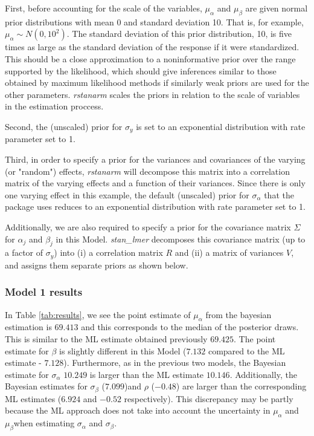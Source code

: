 First, before accounting for the scale of the variables, $\mu_{\alpha}$ and $\mu_{\beta}$ are given normal prior distributions with mean 0 and standard deviation 10.  That is, for example, $\mu_{\alpha} \sim N(0, 10^2)$. The standard deviation of this prior distribution, 10, is five times as large as the standard deviation of the response if it were standardized. This should be a close approximation to a noninformative prior over the range supported by the likelihood, which should give inferences similar to those obtained by maximum likelihood methods if similarly weak priors are used for the other parameters. \textit{rstanarm} scales the priors in relation to the scale of variables in the estimation proccess.

Second, the (unscaled) prior for $\sigma_{y}$ is set to an exponential distribution with rate parameter set to 1.

Third, in order to specify a prior for the variances and covariances of the varying (or "random") effects, \textit{rstanarm} will decompose this matrix into a correlation matrix of the varying effects and a function of their variances.  Since there is only one varying effect in this example, the default (unscaled) prior for $\sigma_{\alpha}$ that the package uses reduces to an exponential distribution with rate parameter set to 1.

Additionally, we are also required to specify a prior for the covariance matrix $\Sigma$ for $\alpha_j$ and $\beta_j$ in this Model.  \textit{stan\_lmer} decomposes this covariance matrix (up to a factor of $\sigma_y$) into (i) a correlation matrix $R$ and (ii) a matrix of variances $V$, and assigns them separate priors as shown below. 

\subsubsection*{Model 1 results}  
In Table \ref{tab:results}, we see the point estimate of $\mu_{\alpha}$ from the bayesian estimation is $69.413$ and this corresponds to the median of the posterior draws.  This is similar to the ML estimate obtained previously $69.425$.  The point estimate for $\beta$ is slightly different in this Model ($7.132$ compared to the ML estimate -  $7.128$).  Furthermore, as in the previous two models, the Bayesian estimate for $\sigma_{\alpha}$ $10.249$ is larger than the ML estimate $10.146$. Additionally, the Bayesian estimates for $\sigma_{\beta}$ ($7.099$)and $\rho$ ($-0.48$) are larger than the corresponding ML estimates ($6.924$ and $-0.52$ respectively). This discrepancy may be partly because the ML approach does not take into account the uncertainty in $\mu_{\alpha}$ and $\mu_{\beta}$when estimating $\sigma_{\alpha}$ and $\sigma_{\beta}$.

